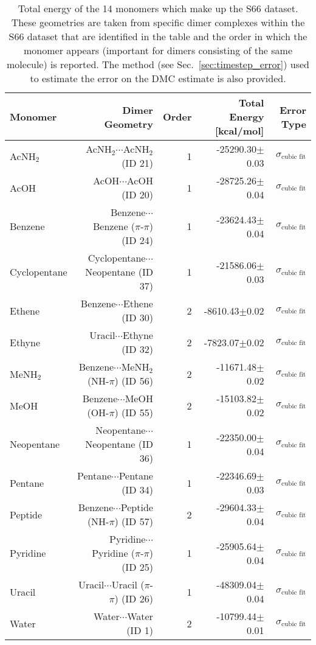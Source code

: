 \begin{table}
\caption{\label{tab:monomer_tot_ene}Total energy of the 14 monomers which make up the S66 dataset. These geometries are taken from specific dimer complexes within the S66 dataset that are identified in the table and the order in which the monomer appears (important for dimers consisting of the same molecule) is reported. The method (see Sec.~\ref{sec:timestep_error}) used to estimate the error on the DMC estimate is also provided.}
\begin{adjustbox}{center}
\begin{tabular}{lrrrr}
\toprule
Monomer & Dimer Geometry & Order & Total Energy [kcal/mol] & Error Type \\ 
\midrule
AcNH$_2$ & AcNH$_2$$\cdots$AcNH$_2$ (ID 21) & 1 & -25290.30$\pm$0.03 & $\sigma_\text{cubic fit}$ \\
AcOH & AcOH$\cdots$AcOH (ID 20) & 1 & -28725.26$\pm$0.04 & $\sigma_\text{cubic fit}$ \\
Benzene & Benzene$\cdots$Benzene ($\pi$-$\pi$) (ID 24) & 1 & -23624.43$\pm$0.04 & $\sigma_\text{cubic fit}$ \\
Cyclopentane & Cyclopentane$\cdots$Neopentane (ID 37) & 1 & -21586.06$\pm$0.03 & $\sigma_\text{cubic fit}$ \\
Ethene & Benzene$\cdots$Ethene (ID 30) & 2 & -8610.43$\pm$0.02 & $\sigma_\text{cubic fit}$ \\
Ethyne & Uracil$\cdots$Ethyne (ID 32) & 2 & -7823.07$\pm$0.02 & $\sigma_\text{cubic fit}$ \\
MeNH$_2$ & Benzene$\cdots$MeNH$_2$ (NH-$\pi$) (ID 56) & 2 & -11671.48$\pm$0.02 & $\sigma_\text{cubic fit}$ \\
MeOH & Benzene$\cdots$MeOH (OH-$\pi$) (ID 55) & 2 & -15103.82$\pm$0.02 & $\sigma_\text{cubic fit}$ \\
Neopentane & Neopentane$\cdots$Neopentane (ID 36) & 1 & -22350.00$\pm$0.04 & $\sigma_\text{cubic fit}$ \\
Pentane & Pentane$\cdots$Pentane (ID 34) & 1 & -22346.69$\pm$0.03 & $\sigma_\text{cubic fit}$ \\
Peptide & Benzene$\cdots$Peptide (NH-$\pi$) (ID 57) & 2 & -29604.33$\pm$0.04 & $\sigma_\text{cubic fit}$ \\
Pyridine & Pyridine$\cdots$Pyridine ($\pi$-$\pi$) (ID 25) & 1 & -25905.64$\pm$0.04 & $\sigma_\text{cubic fit}$ \\
Uracil & Uracil$\cdots$Uracil ($\pi$-$\pi$) (ID 26) & 1 & -48309.04$\pm$0.04 & $\sigma_\text{cubic fit}$ \\
Water & Water$\cdots$Water (ID 1) & 2 & -10799.44$\pm$0.01 & $\sigma_\text{cubic fit}$ \\
\bottomrule
\end{tabular}
\end{adjustbox}
\end{table}